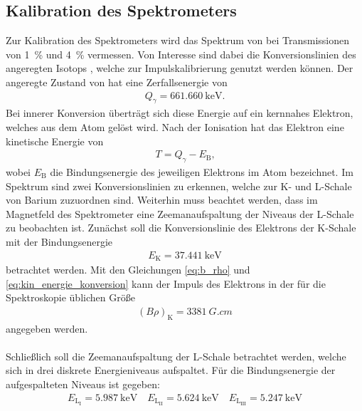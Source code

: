 \documentclass[11pt, a4paper]{article}
\numberwithin{equation}{section}
\begin{document}
\subsection{Kalibration des Spektrometers}
\label{ssec:kalibration}
Zur Kalibration des Spektrometers wird das Spektrum von  bei Transmissionen von \SI{1}{\percent} und \SI{4}{\percent} vermessen.
Von Interesse sind dabei die Konversionslinien des angeregten Isotops , welche zur Impulskalibrierung genutzt werden können.
Der angeregte Zustand von  hat eine Zerfallsenergie von
\begin{align*}
	Q_\gamma = \SI{661,660}{\kilo\electronvolt}\text{.}
\end{align*}
Bei innerer Konversion überträgt sich diese Energie auf ein kernnahes Elektron, welches aus dem Atom gelöst wird.
Nach der Ionisation hat das Elektron eine kinetische Energie von
\begin{align}
	T = Q_\gamma - E_\mathrm{B} \text{,}
	\label{eq:kin_energie_konversion}
\end{align}
wobei $E_\mathrm{B}$ die Bindungsenergie des jeweiligen Elektrons im Atom bezeichnet.
Im Spektrum sind zwei Konversionslinien zu erkennen, welche zur K- und L-Schale von Barium zuzuordnen sind.
Weiterhin muss beachtet werden, dass im Magnetfeld des Spektrometer eine Zeemanaufspaltung der Niveaus der L-Schale zu beobachten ist.
Zunächst soll die Konversionslinie des Elektrons der K-Schale mit der Bindungsenergie
\begin{align*}
E_\mathrm{K} = \SI{37,441}{\kilo\electronvolt}
\end{align*}
betrachtet werden.
Mit den Gleichungen \eqref{eq:b_rho} und \eqref{eq:kin_energie_konversion} kann der Impuls des Elektrons in der für die Spektroskopie üblichen Größe
\begin{align*}
	\left(B \rho \right)_\mathrm{K} = \SI{3381}{G.cm}
\end{align*}
angegeben werden.
\\
\\
Schließlich soll die Zeemanaufspaltung der L-Schale betrachtet werden, welche sich in drei diskrete Energieniveaus aufspaltet.
Für die Bindungsenergie der aufgespalteten Niveaus ist gegeben:
\begin{align*}
E_{\mathrm{L}_{\mathrm{I}}} = \SI{5,987}{\kilo\electronvolt} \quad
E_{\mathrm{L}_{\mathrm{II}}} = \SI{5,624}{\kilo\electronvolt} \quad
E_{\mathrm{L}_{\mathrm{III}}} = \SI{5,247}{\kilo\electronvolt}
\end{align*}
\end{document}
